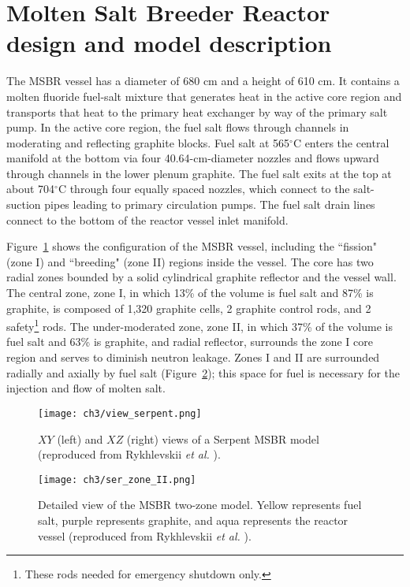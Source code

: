 \section{Molten Salt Breeder Reactor design and model description}
The \gls{MSBR} vessel has a diameter of 680 cm and a height of 610 cm. It 
contains a molten fluoride fuel-salt mixture that generates heat in the active 
core region and transports that heat to the primary heat exchanger by way of 
the primary salt pump. In the active core region, the fuel salt flows through 
channels in moderating and reflecting graphite blocks. Fuel salt at 
565$^{\circ}$C enters the central manifold at the bottom via four  
40.64-cm-diameter nozzles and flows upward through channels in the lower 
plenum graphite. The fuel salt exits at the top at about 704$^{\circ}$C 
through four equally spaced nozzles, which connect to the salt-suction pipes 
leading to primary circulation pumps. The fuel salt drain lines connect to the 
bottom of the reactor vessel inlet manifold.

Figure~\ref{fig:serpent_plan_view} shows the configuration of the \gls{MSBR} 
vessel, including the ``fission" (zone I) and ``breeding" (zone II) regions 
inside the vessel. The core has two radial zones bounded by a solid  
cylindrical graphite reflector and the vessel wall. The central zone, zone I, 
in which 13\% of the volume is fuel salt and 87\% is graphite, is composed of 
1,320 graphite cells, 2 graphite control rods, and 2 safety\footnote{ These 
rods needed for emergency shutdown only.} rods. The under-moderated zone, zone 
II, in which 37\% of the volume is fuel salt and 63\% is graphite, and radial 
reflector, surrounds the zone I core region and serves to diminish neutron 
leakage. Zones I and II are surrounded radially and axially by fuel salt 
(Figure~\ref{fig:serpent_zoneII}); this space for fuel is necessary for the 
injection and flow of molten salt.
\begin{figure}[t] %
	\texttt{[image: ch3/view\_serpent.png]}
	\caption{$XY$ (left) and $XZ$ (right) views of a Serpent \gls{MSBR} model 
	(reproduced from Rykhlevskii \emph{et al.} 
	\cite{rykhlevskii_modeling_2019}).}
	\label{fig:serpent_plan_view}
\end{figure}

\begin{figure}[t!] %
	\texttt{[image: ch3/ser\_zone\_II.png]}
	\caption{Detailed view of the \gls{MSBR} two-zone model. 
		Yellow represents fuel salt, purple represents graphite, and aqua 
		represents the reactor vessel (reproduced from Rykhlevskii 
		\emph{et al.} \cite{rykhlevskii_modeling_2019}).}
	\label{fig:serpent_zoneII}
\end{figure}

